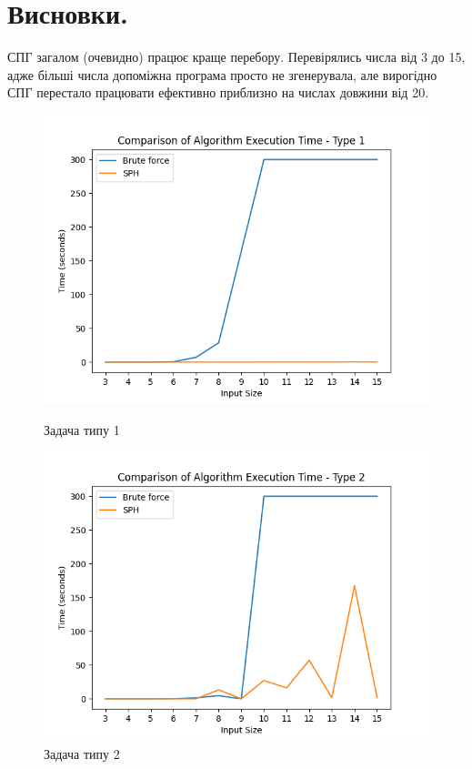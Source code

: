 \documentclass[a4paper,12pt]{article}
\begin{document}
\section{Висновки.}
СПГ загалом (очевидно) працює краще перебору. Перевірялись числа від 3 до 15, адже більші числа допоміжна програма просто не згенерувала, але вирогідно СПГ перестало працювати ефективно приблизно на числах довжини від 20.
\begin{figure}[!htb]
  \includegraphics[width=\linewidth]{plot1.png}
  \caption{Задача типу 1}\label{fig:type1}
\endminipage\hfill
{}
  \includegraphics[width=\linewidth]{plot2.png}
  \caption{Задача типу 2}\label{fig:type2}
\endminipage\hfill
\end{figure}
\end{document}
